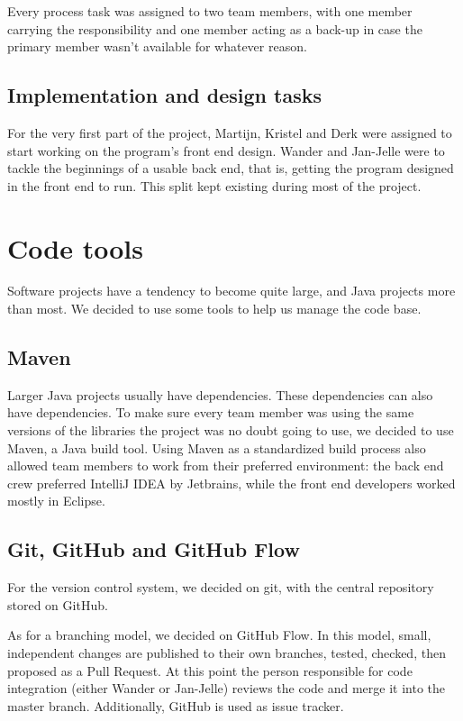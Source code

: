 Every process task was assigned to two team members, with one member carrying the responsibility and one member acting as a back-up in case the primary member wasn't available for whatever reason.

\subsection{Implementation and design tasks}

For the very first part of the project, Martijn, Kristel and Derk were assigned to start working on the program's front end design. Wander and Jan-Jelle were to tackle the beginnings of a usable back end, that is, getting the program designed in the front end to run. This split kept existing during most of the project.

\section{Code tools}

Software projects have a tendency to become quite large, and Java projects more than most. We decided to use some tools to help us manage the code base.

\subsection{Maven}

Larger Java projects usually have dependencies. These dependencies can also have dependencies. To make sure every team member was using the same versions of the libraries the project was no doubt going to use, we decided to use Maven, a Java build tool. Using Maven as a standardized build process also allowed team members to work from their preferred environment: the back end crew preferred IntelliJ IDEA by Jetbrains, while the front end developers worked mostly in Eclipse. 

\subsection{Git, GitHub and GitHub Flow}

For the version control system, we decided on git, with the central repository stored on GitHub.  

As for a branching model, we decided on GitHub Flow\cite{githubflow}. In this model, small, independent changes are published to their own branches, tested, checked, then proposed as a Pull Request. At this point the person responsible for code integration (either Wander or Jan-Jelle) reviews the code and merge it into the master branch.  Additionally, GitHub is used as issue tracker.

